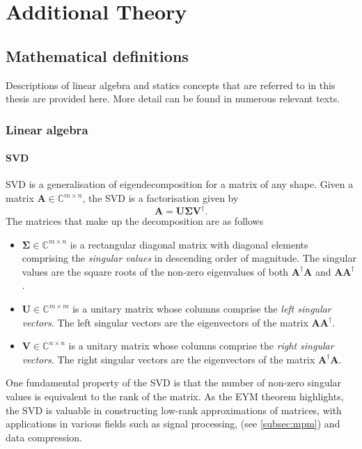 \chapter{Additional Theory}
\label{chap:additional-theory}

\section{Mathematical definitions}

Descriptions of linear algebra and statics concepts that are referred to in
this thesis are provided here. More detail can be found in numerous relevant
texts\cite{Strang2018,Pawitan2001}.

\subsection{Linear algebra}
\label{subsec:linear-algebra}


\subsubsection{\Acl{SVD}}
\ac{SVD} is a generalisation of eigendecomposition for a matrix of any shape.
Given a matrix $\symbf{A} \in \mathbb{C}^{m \times n}$, the \ac{SVD} is a
factorisation given by
\begin{equation}
    \symbf{A} = \symbf{U} \symbf{\Sigma} \symbf{V}^{\dagger}.
\end{equation}
The matrices that make up the decomposition are as follows
\begin{itemize}[label={}]
    \item $\symbf{\Sigma} \in \mathbb{C}^{m \times n}$ is a rectangular
        diagonal matrix with diagonal elements comprising the \emph{singular
        values} in descending order of magnitude. The singular values are the
        square roots of the non-zero eigenvalues of both
        $\symbf{A}^{\dagger}\symbf{A}$ and
        $\symbf{A}\symbf{A}^{\dagger}$.
    \item $\symbf{U} \in \mathbb{C}^{m \times m}$ is a unitary matrix whose columns
        comprise the \emph{left singular vectors}. The left singular vectors
        are the eigenvectors of the matrix $\symbf{A}\symbf{A}^{\dagger}$.
    \item $\symbf{V} \in \mathbb{C}^{n \times n}$ is a unitary matrix whose columns
        comprise the \emph{right singular vectors}. The right singular vectors
        are the eigenvectors of the matrix $\symbf{A}^{\dagger}\symbf{A}$.
\end{itemize}
One fundamental property of the \ac{SVD} is that the number of non-zero
singular values is equivalent to the rank of the matrix. As the \ac{EYM}
theorem highlights, the \ac{SVD} is valuable in constructing low-rank
approximations of matrices, with applications in various fields such as signal
processing, (see \cref{subsec:mpm}) and data compression.

